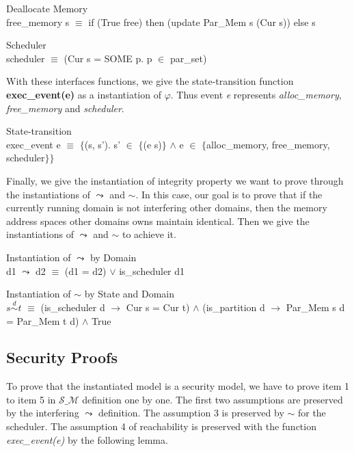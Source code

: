 \documentclass[runningheads]{llncs}
\newcommand{\equidom}[3]{{#1}\stackrel{#2}{\sim}{#3}}
\newcommand{\interf}{\leadsto}
\begin{document}
\begin{definition} {Deallocate Memory} \\
free\_memory s $\equiv$ if (True free) then (update Par\_Mem s (Cur s)) else s
\end{definition}

\begin{definition} {Scheduler} \\
scheduler $\equiv$ (Cur s = SOME p. p $\in$ par\_set)
\end{definition}

With these interfaces functions, we give the state-transition function \textbf{exec\_event(e)} as a instantiation of $\varphi$. Thus event \emph{e} represents \emph{alloc\_memory}, \emph{free\_memory} and \emph{scheduler}.

\begin{definition} {State-transition} \\
exec\_event e $\equiv$ $\lbrace$(s, s'). s' $\in$ $\lbrace$(e s)$\rbrace$ $\wedge$ e $\in$ $\lbrace$alloc\_memory, free\_memory, scheduler$\rbrace$$\rbrace$
\end{definition}

Finally, we give the instantiation of integrity property we want to prove through the instantiations of $\interf$ and $\sim$. In this case, our goal is to prove that if the currently running domain is not interfering other domains, then the memory address spaces other domains owns maintain identical. Then we give the instantiations of $\interf$ and $\sim$ to achieve it.

\begin{definition} {Instantiation of $\interf$ by Domain} \\
d1 $\interf$ d2 $\equiv$ (d1 = d2) $\vee$ is\_scheduler d1
\end{definition}

\begin{definition} {Instantiation of $\sim$ by State and Domain} \\
$\equidom{s}{d}{t}$ $\equiv$ (is\_scheduler d $\longrightarrow$ Cur s = Cur t) $\wedge$ (is\_partition d $\longrightarrow$ Par\_Mem s d = Par\_Mem t d) $\wedge$ True
\end{definition}


\subsection{Security Proofs}

To prove that the instantiated model is a security model, we have to prove item 1 to item 5 in $\mathcal{S\_M}$ definition one by one. The first two assumptions are preserved by the interfering $\interf$ definition. The assumption 3 is preserved by $\sim$ for the scheduler. The assumption 4 of reachability is preserved with the function \emph{exec\_event(e)} by the following lemma.
\end{document}
